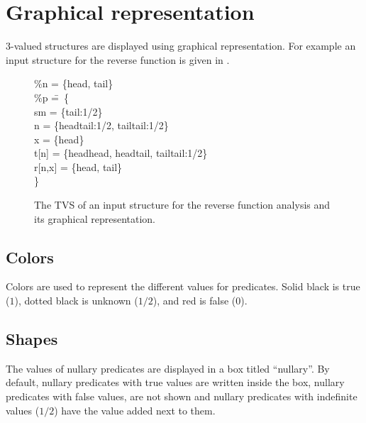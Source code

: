 \section{Graphical representation}

$3$-valued structures are displayed using graphical
representation. For example an input structure for the reverse
function is given in .

\begin{figure}
\begin{center}
\begin{minipage}[t]{.33\linewidth}
\begin{tabbing}
\%n = \{head, tail\}\\
\%p =\=\+\ \{\\
      sm = \{tail:1/2\}\\
      n = \{head\deref tail:1/2, tail\deref tail:1/2\}\\
      x = \{head\}\\
      t[n] = \{head\deref head, head\deref tail, tail\deref tail:1/2\}\\
      r[n,x] = \{head, tail\}\-\\
\}
\end{tabbing}
\end{minipage}\hfill
\begin{minipage}[t]{.33\linewidth}
\vspace*{0mm} 
\end{minipage}
\end{center}
\caption{\label{Fi:ManReverseTVS}The TVS of an input structure for
the reverse function analysis and its graphical representation.}
\end{figure}

\subsection{Colors}

Colors are used to represent the different values for predicates.
Solid black is true ($1$), dotted black is unknown ($1/2$), and
red is false ($0$).

\subsection{Shapes}

The values of nullary predicates are displayed in a box titled
``nullary''.  By default, nullary predicates with true values are
written inside the box, nullary predicates with false values, are
not shown and nullary predicates with indefinite values ($1/2$)
have the value added next to them.

